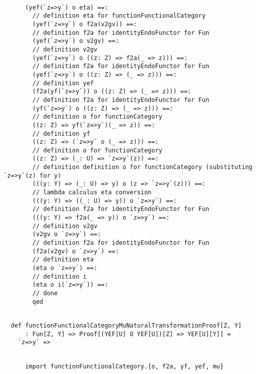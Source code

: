 \documentclass[11pt]{article}
\begin{document}
\begin{mdframed}[backgroundcolor=lightgray!20] 
\begin{lstlisting} 
      
      (yef(`z=>y`) o eta) ==:
        // definition eta for functionFunctionalCategory
        (yef(`z=>y`) o f2a(v2gv)) ==:
        // definition f2a for identityEndoFunctor for Fun
        (yef(`z=>y`) o v2gv) ==:
        // definition v2gv
        (yef(`z=>y`) o ((z: Z) => f2a(_ => z))) ==:
        // definition f2a for identityEndoFunctor for Fun
        (yef(`z=>y`) o ((z: Z) => (_ => z))) ==:
        // definition yef
        (f2a(yf(`z=>y`)) o ((z: Z) => (_ => z))) ==:
        // definition f2a for identityEndoFunctor for Fun
        (yf(`z=>y`) o ((z: Z) => (_ => z))) ==:
        // definition o for functionCategory
        ((z: Z) => yf(`z=>y`)(_ => z)) ==:
        // definition yf
        ((z: Z) => (`z=>y` o (_ => z))) ==:
        // definition o for functionCategory
        ((z: Z) => (_: U) => `z=>y`(z)) ==:
        // definition definition o for functionCategory (substituting `z=>y`(z) for y)
        (((y: Y) => (_: U) => y) o (z => `z=>y`(z))) ==:
        // lambda calculus eta conversion
        (((y: Y) => ((_: U) => y)) o `z=>y`) ==:
        // definition f2a for identityEndoFunctor for Fun
        (((y: Y) => f2a(_ => y)) o `z=>y`) ==:
        // definition v2gv
        (v2gv o `z=>y`) ==:
        // definition f2a for identityEndoFunctor for Fun
        (f2a(v2gv) o `z=>y`) ==:
        // definition eta
        (eta o `z=>y`) ==:
        // definition i
        (eta o i(`z=>y`)) ==:
        // done
        qed
\end{lstlisting}
\end{mdframed}
\vspace{6pt}
\begin{mdframed}[backgroundcolor=lightgray!20] 
\begin{lstlisting} 
  
  def functionFunctionalCategoryMuNaturalTransformationProof[Z, Y]
      : Fun[Z, Y] => Proof[(YEF[U] O YEF[U])[Z] => YEF[U][Y]] =
    `z=>y` =>
\end{lstlisting}
\end{mdframed}
\vspace{6pt}
\begin{mdframed}[backgroundcolor=lightgray!20] 
\begin{lstlisting}

      import functionFunctionalCategory.{o, f2a, yf, yef, mu}
\end{lstlisting}
\end{mdframed}
\end{document}
